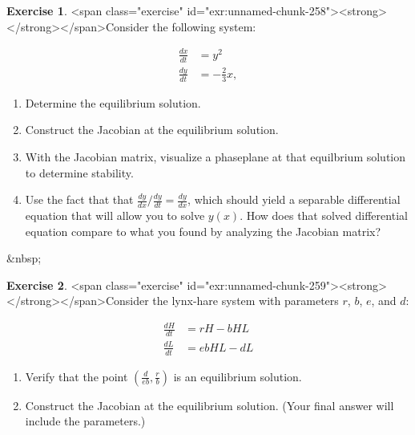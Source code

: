 \documentclass[
]{book}
\theoremstyle{definition}
\theoremstyle{definition}
\theoremstyle{definition}
\newtheorem{exercise}{Exercise}[chapter]
\theoremstyle{remark}
\begin{document}
\begin{exercise}
<span class="exercise" id="exr:unnamed-chunk-258"><strong>\label{exr:unnamed-chunk-258} </strong></span>Consider the following system:

\begin{equation}
\begin{split}
\frac{dx}{dt} &= y^{2} \\
\frac{dy}{dt} &= -\frac{2}{3} x,
\end{split}
\end{equation}

\begin{enumerate}[label=\alph*.]
\item Determine the equilibrium solution.
\item Construct the Jacobian at the equilibrium solution.
\item With the Jacobian matrix, visualize a phaseplane at that equilbrium solution to determine stability.
\item Use the fact that that $\displaystyle \frac{dy}{dx} / \frac{dy}{dt} = \frac{dy}{dx}$, which should yield a separable differential equation that will allow you to solve $y(x)$.  How does that solved differential equation compare to what you found by analyzing the Jacobian matrix?
\end{enumerate}
\end{exercise}

&nbsp;


\begin{exercise}
<span class="exercise" id="exr:unnamed-chunk-259"><strong>\label{exr:unnamed-chunk-259} </strong></span>Consider the lynx-hare system with parameters $r$, $b$, $e$, and $d$:
  
\begin{equation}
\begin{split}
\frac{dH}{dt} &= r H - b HL \\
\frac{dL}{dt} &=ebHL -dL
\end{split}
\end{equation}

\begin{enumerate}[label=\alph*.]
\item Verify that the point $\displaystyle \left( \frac{d}{eb}, \frac{r}{b} \right)$ is an equilibrium solution.
\item Construct the Jacobian at the equilibrium solution. (Your final answer will include the parameters.)
\end{enumerate}
\end{exercise}
\end{document}
